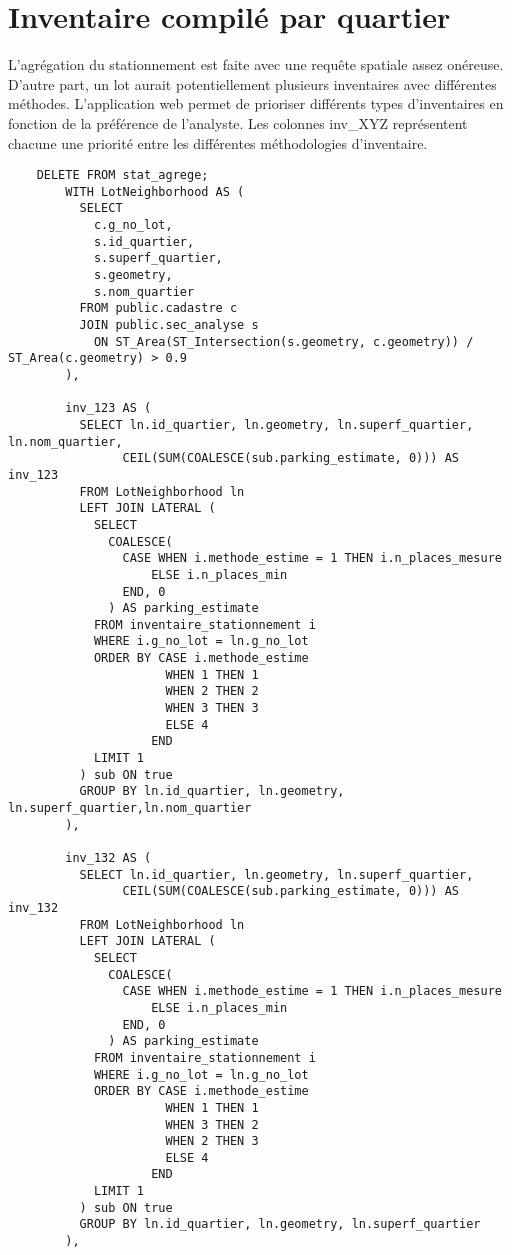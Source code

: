 \section{Inventaire compilé par quartier}\label{sec:annexe_inventaire_agrege_par_quartier}
L'agrégation du stationnement est faite avec une requête spatiale assez onéreuse. D'autre part, un lot aurait potentiellement plusieurs inventaires avec différentes méthodes. L'application web permet de prioriser différents types d'inventaires en fonction de la préférence de l'analyste. Les colonnes inv\_XYZ représentent chacune une priorité entre les différentes méthodologies d'inventaire.
\begin{lstlisting}
    DELETE FROM stat_agrege;
        WITH LotNeighborhood AS (
          SELECT 
            c.g_no_lot, 
            s.id_quartier,
            s.superf_quartier,
            s.geometry,
            s.nom_quartier
          FROM public.cadastre c
          JOIN public.sec_analyse s 
            ON ST_Area(ST_Intersection(s.geometry, c.geometry)) / ST_Area(c.geometry) > 0.9
        ),

        inv_123 AS (
          SELECT ln.id_quartier, ln.geometry, ln.superf_quartier, ln.nom_quartier,
                CEIL(SUM(COALESCE(sub.parking_estimate, 0))) AS inv_123
          FROM LotNeighborhood ln
          LEFT JOIN LATERAL (
            SELECT 
              COALESCE(
                CASE WHEN i.methode_estime = 1 THEN i.n_places_mesure
                    ELSE i.n_places_min
                END, 0
              ) AS parking_estimate
            FROM inventaire_stationnement i
            WHERE i.g_no_lot = ln.g_no_lot
            ORDER BY CASE i.methode_estime
                      WHEN 1 THEN 1
                      WHEN 2 THEN 2
                      WHEN 3 THEN 3
                      ELSE 4
                    END
            LIMIT 1
          ) sub ON true
          GROUP BY ln.id_quartier, ln.geometry, ln.superf_quartier,ln.nom_quartier
        ),

        inv_132 AS (
          SELECT ln.id_quartier, ln.geometry, ln.superf_quartier, 
                CEIL(SUM(COALESCE(sub.parking_estimate, 0))) AS inv_132
          FROM LotNeighborhood ln
          LEFT JOIN LATERAL (
            SELECT 
              COALESCE(
                CASE WHEN i.methode_estime = 1 THEN i.n_places_mesure
                    ELSE i.n_places_min
                END, 0
              ) AS parking_estimate
            FROM inventaire_stationnement i
            WHERE i.g_no_lot = ln.g_no_lot
            ORDER BY CASE i.methode_estime
                      WHEN 1 THEN 1
                      WHEN 3 THEN 2
                      WHEN 2 THEN 3
                      ELSE 4
                    END
            LIMIT 1
          ) sub ON true
          GROUP BY ln.id_quartier, ln.geometry, ln.superf_quartier
        ),


\end{lstlisting}
